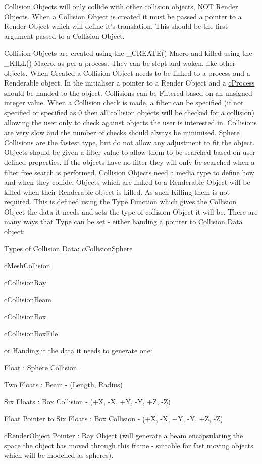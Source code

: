 Collision Objects will only collide with other collision objects, NOT Render Objects. When a Collision Object is created it must be passed a pointer to a Render Object which will define it's translation. This should be the first argument passed to a Collision Object.

Collision Objects are created using the \_\-CREATE() Macro and killed using the \_\-KILL() Macro, as per a process. They can be slept and woken, like other objects. When Created a Collision Object needs to be linked to a process and a Renderable object. In the initialiser a pointer to a Render Object and a \hyperlink{classc_process}{cProcess} should be handed to the object. Collisions can be Filtered based on an unsigned integer value. When a Collision check is made, a filter can be specified (if not specified or specified as 0 then all collision objects will be checked for a collision) allowing the user only to check against objects the user is interested in. Collisions are very slow and the number of checks should always be minimised. Sphere Collisions are the fastest type, but do not allow any adjustment to fit the object. Objects should be given a filter value to allow them to be searched based on user defined properties. If the objects have no filter they will only be searched when a filter free search is performed. Collision Objects need a media type to define how and when they collide. Objects which are linked to a Renderable Object will be killed when their Renderable object is killed. As such Killing them is not required. This is defined using the Type Function which gives the Collision Object the data it needs and sets the type of collision Object it will be. There are many ways that Type can be set -\/ either handing a pointer to Collision Data object: \par
 \par
 Types of Collision Data: cCollisionSphere\par
 cMeshCollision\par
 cCollisionRay\par
 cCollisionBeam\par
 cCollisionBox\par
 cCollisionBoxFile\par
 \par
 or Handing it the data it needs to generate one:\par
 Float : Sphere Collision.\par
 Two Floats : Beam -\/ (Length, Radius) \par
 Six Floats : Box Collision -\/ (+X, -\/X, +Y, -\/Y, +Z, -\/Z) \par
 Float Pointer to Six Floats : Box Collision -\/ (+X, -\/X, +Y, -\/Y, +Z, -\/Z) \par
 \hyperlink{classc_render_object}{cRenderObject} Pointer : Ray Object (will generate a beam encapsulating the space the object has moved through this frame -\/ suitable for fast moving objects which will be modelled as spheres). \par



